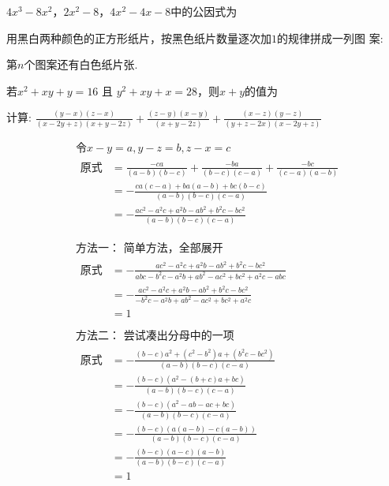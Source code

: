 \documentclass[answers]{exam} %
\begin{document}
\begin{questions}

\question
  $4x^3 - 8x^2$，$2x^2 - 8$，$4x^2 - 4x - 8$中的公因式为
  \fillin[$2(x-2)$]

\question
  用黑白两种颜色的正方形纸片，按黑色纸片数量逐次加$1$的规律拼成一列图
  案:

  第$n$个图案还有白色纸片\fillin[$(3n+1)$]张.

\question
  若$x^2 + xy + y = 16$ 且 $y^2 + xy + x = 28$，则$x+y$的值为
  \fillin[$6 \mbox{或} -7$]

\question
  计算: $ \frac{(y-x)(z-x)}{(x - 2y + z)(x + y - 2z)}
  + \frac{(z-y)(x-y)}{(x + y -2z)}
  + \frac{(x-z)(y-z)}{(y + z - 2x)(x - 2y + z)}$

  \vspace*{1in}
  \begin{solution}
    \[
      \begin{aligned}
        & \mbox{令} x-y = a, y-z = b, z-x=c \\
        & \begin{aligned}
          \mbox{原式} &= \frac{-ca}{(a-b)(b-c)} + \frac{-ba}{(b-c)(c-a)} + \frac{-bc}{(c-a)(a-b)} \\
          &= - \frac{ ca(c-a) + ba(a-b) + bc(b-c) } {(a-b)(b-c)(c-a)} \\
          &= - \frac{ ac^2 - a^2c + a^2b - ab^2 + b^2c - bc^2 } {(a-b)(b-c)(c-a)} \\
        & \\
        \end{aligned} \\
        & \mbox{方法一： 简单方法，全部展开} \\
        & \begin{aligned}
          \mbox{原式} &= - \frac{ ac^2 - a^2c + a^2b - ab^2 + b^2c - bc^2 } {abc - b^2c - a^2b + ab^2 - ac^2 + bc^2 + a^2c - abc} \\
          &= - \frac{ ac^2 - a^2c + a^2b - ab^2 + b^2c - bc^2 } { - b^2c - a^2b + ab^2 - ac^2 + bc^2 + a^2c } \\
          &= 1
        \end{aligned} \\
        & \\
        & \mbox{方法二： 尝试凑出分母中的一项} \\
        & \begin{aligned}
          \mbox{原式} &= - \frac{ (b-c)a^2 + (c^2 - b^2)a + (b^2c - bc^2) }{(a-b)(b-c)(c-a)} \\
          &= - \frac{ (b-c)(a^2 - (b+c)a + bc) }{(a-b)(b-c)(c-a)} \\
          &= - \frac{ (b-c)(a^2 - ab - ac + bc) }{(a-b)(b-c)(c-a)} \\
          &= - \frac{ (b-c)(a(a - b) - c(a - b)) }{(a-b)(b-c)(c-a)} \\
          &= - \frac{ (b-c)(a - c)(a - b) }{(a-b)(b-c)(c-a)} \\
          &= 1
        \end{aligned} \\
      \end{aligned}
    \]
  \end{solution}


\end{questions}
\end{document}
